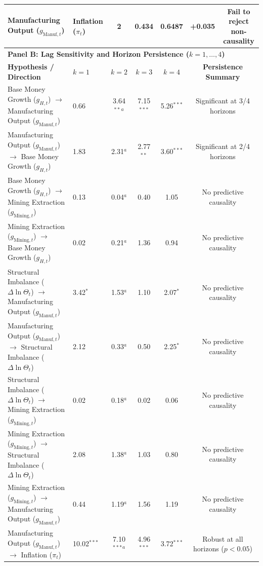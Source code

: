 \begin{table}[htbp]
{\begin{tabular}{llccccc}
Manufacturing Output ($g_{\text{Manuf},t}$) & Inflation ($\pi_t$) & 2 & 0.434 & 0.6487 & +0.035 & Fail to reject non-causality \\
\midrule
\multicolumn{7}{l}{\textbf{Panel B: Lag Sensitivity and Horizon Persistence ($k = 1, \dots, 4$)}} \\
\midrule
\textbf{Hypothesis / Direction} & \textbf{$k = 1$} & \textbf{$k = 2$} & \textbf{$k = 3$} & \textbf{$k = 4$} & \multicolumn{2}{c}{\textbf{Persistence Summary}} \\
\midrule
Base Money Growth ($g_{H,t}$) $\to$ Manufacturing Output ($g_{\text{Manuf},t}$) & 0.66 & 3.64$^{**}$$^a$ & 7.15$^{***}$ & 5.26$^{***}$ & \multicolumn{2}{c}{Significant at 3/4 horizons} \\
Manufacturing Output ($g_{\text{Manuf},t}$) $\to$ Base Money Growth ($g_{H,t}$) & 1.83 & 2.31$^a$ & 2.77$^{**}$ & 3.60$^{***}$ & \multicolumn{2}{c}{Significant at 2/4 horizons} \\
Base Money Growth ($g_{H,t}$) $\to$ Mining Extraction ($g_{\text{Mining},t}$) & 0.13 & 0.04$^a$ & 0.40 & 1.05 & \multicolumn{2}{c}{No predictive causality} \\
Mining Extraction ($g_{\text{Mining},t}$) $\to$ Base Money Growth ($g_{H,t}$) & 0.02 & 0.21$^a$ & 1.36 & 0.94 & \multicolumn{2}{c}{No predictive causality} \\
Structural Imbalance ($\Delta \ln \Theta_t$) $\to$ Manufacturing Output ($g_{\text{Manuf},t}$) & 3.42$^{*}$ & 1.53$^a$ & 1.10 & 2.07$^{*}$ & \multicolumn{2}{c}{No predictive causality} \\
Manufacturing Output ($g_{\text{Manuf},t}$) $\to$ Structural Imbalance ($\Delta \ln \Theta_t$) & 2.12 & 0.33$^a$ & 0.50 & 2.25$^{*}$ & \multicolumn{2}{c}{No predictive causality} \\
Structural Imbalance ($\Delta \ln \Theta_t$) $\to$ Mining Extraction ($g_{\text{Mining},t}$) & 0.02 & 0.18$^a$ & 0.02 & 0.06 & \multicolumn{2}{c}{No predictive causality} \\
Mining Extraction ($g_{\text{Mining},t}$) $\to$ Structural Imbalance ($\Delta \ln \Theta_t$) & 2.08 & 1.38$^a$ & 1.03 & 0.80 & \multicolumn{2}{c}{No predictive causality} \\
Mining Extraction ($g_{\text{Mining},t}$) $\to$ Manufacturing Output ($g_{\text{Manuf},t}$) & 0.44 & 1.19$^a$ & 1.56 & 1.19 & \multicolumn{2}{c}{No predictive causality} \\
Manufacturing Output ($g_{\text{Manuf},t}$) $\to$ Inflation ($\pi_t$) & 10.02$^{***}$ & 7.10$^{***}$$^a$ & 4.96$^{***}$ & 3.72$^{***}$ & \multicolumn{2}{c}{Robust at all horizons ($p < 0.05$)} \\

\end{tabular}}
\end{table}
